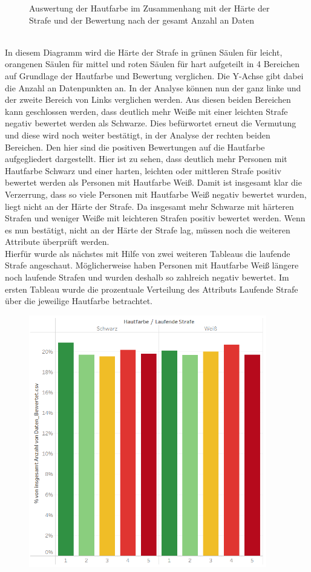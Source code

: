 \begin{onehalfspace}
\begin{figure}[!h]
    \caption{Auswertung der Hautfarbe im Zusammenhang mit der Härte der Strafe und der Bewertung nach der gesamt Anzahl an Daten}
    \label{fig:TabHaut2}
\end{figure}\\
In diesem Diagramm wird die Härte der Strafe in grünen Säulen für leicht, orangenen Säulen für mittel und roten Säulen für hart aufgeteilt in 4 Bereichen auf Grundlage der Hautfarbe und Bewertung verglichen. Die Y-Achse gibt dabei die Anzahl an Datenpunkten an. In der Analyse können nun der ganz linke und der zweite Bereich von Links verglichen werden. Aus diesen beiden Bereichen kann geschlossen werden, dass deutlich mehr Weiße mit einer leichten Strafe negativ bewertet werden als Schwarze. Dies befürwortet erneut die Vermutung und diese wird noch weiter bestätigt, in der Analyse der rechten beiden Bereichen. Den hier sind die positiven Bewertungen auf die Hautfarbe aufgegliedert dargestellt. Hier ist zu sehen, dass deutlich mehr Personen mit Hautfarbe Schwarz und einer harten, leichten oder mittleren Strafe positiv bewertet werden als Personen mit Hautfarbe Weiß. Damit ist insgesamt klar die Verzerrung, dass so viele Personen mit Hautfarbe Weiß negativ bewertet wurden, liegt nicht an der Härte der Strafe. Da insgesamt mehr Schwarze mit härteren Strafen und weniger Weiße mit leichteren Strafen positiv bewertet werden. Wenn es nun bestätigt, nicht an der Härte der Strafe lag, müssen noch die weiteren Attribute überprüft werden.\\
Hierfür wurde als nächstes mit Hilfe von zwei weiteren Tableaus die laufende Strafe angeschaut. Möglicherweise haben Personen mit Hautfarbe Weiß längere noch laufende Strafen und wurden deshalb so zahlreich negativ bewertet. Im ersten Tableau wurde die prozentuale Verteilung des Attributs Laufende Strafe über die jeweilige Hautfarbe betrachtet.
\begin{figure}[h]
    \centering
    \includegraphics[height=11cm]{Diagramme/Tab_Haut3.PNG}

\end{figure}
\end{onehalfspace}
